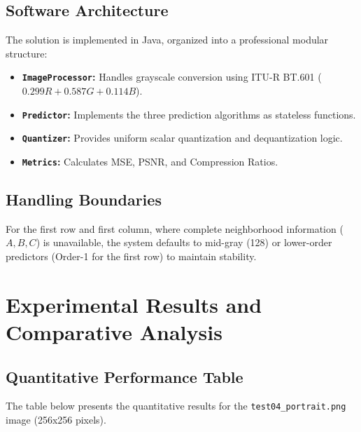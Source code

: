 \documentclass[12pt,a4paper]{article}
\begin{document}
\subsection{Software Architecture}

The solution is implemented in Java, organized into a professional modular structure:
\begin{itemize}
    \item \textbf{\texttt{ImageProcessor}:} Handles grayscale conversion using ITU-R BT.601 ($0.299R + 0.587G + 0.114B$).
    \item \textbf{\texttt{Predictor}:} Implements the three prediction algorithms as stateless functions.
    \item \textbf{\texttt{Quantizer}:} Provides uniform scalar quantization and dequantization logic.
    \item \textbf{\texttt{Metrics}:} Calculates MSE, PSNR, and Compression Ratios.
\end{itemize}

\subsection{Handling Boundaries}

For the first row and first column, where complete neighborhood information ($A, B, C$) is unavailable, the system defaults to mid-gray (128) or lower-order predictors (Order-1 for the first row) to maintain stability.

\section{Experimental Results and Comparative Analysis}

\subsection{Quantitative Performance Table}

The table below presents the quantitative results for the \texttt{test04\_portrait.png} image (256x256 pixels).
\end{document}
